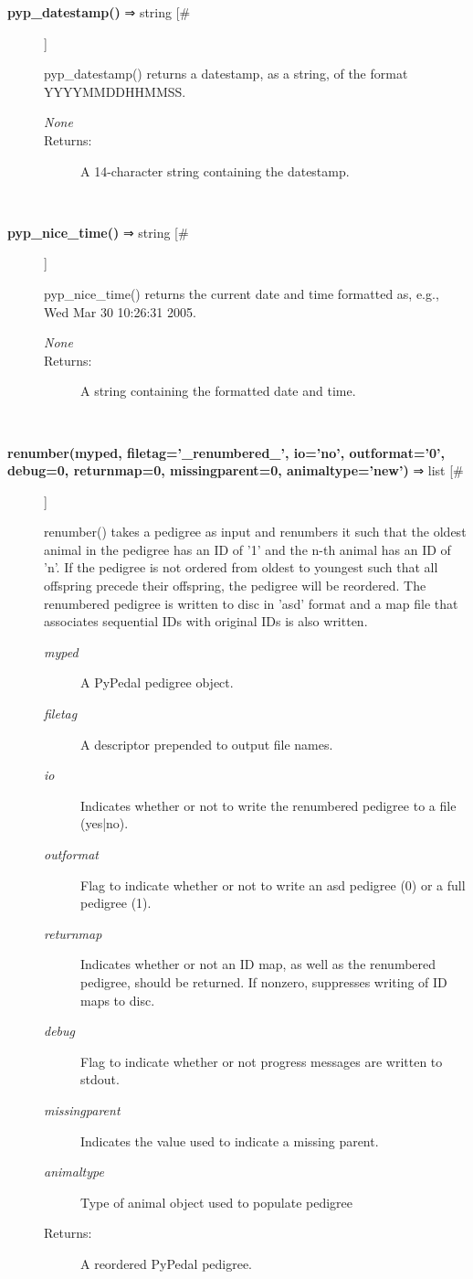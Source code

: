 \documentclass{article}
\begin{document}
\begin{description}
\item[\textbf{pyp\_datestamp()} ⇒ string [\#]
]
\par pyp\_datestamp() returns a datestamp, as a string, of the format
YYYYMMDDHHMMSS.
\begin{description}
\item[\textit{None}
]

\item[Returns:
]
A 14-character string containing the datestamp.
\end{description}\\

\item[\textbf{pyp\_nice\_time()} ⇒ string [\#]
]
\par pyp\_nice\_time() returns the current date and time formatted as, e.g.,
Wed Mar 30 10:26:31 2005.
\begin{description}
\item[\textit{None}
]

\item[Returns:
]
A string containing the formatted date and time.
\end{description}\\

\item[\textbf{renumber(myped, filetag='\_renumbered\_', io='no', outformat='0', debug=0, returnmap=0, missingparent=0, animaltype='new')} ⇒ list [\#]
]
\par renumber() takes a pedigree as input and renumbers it such that the oldest
animal in the pedigree has an ID of '1' and the n-th animal has an ID of 'n'.  If the
pedigree is not ordered from oldest to youngest such that all offspring precede their
offspring, the pedigree will be reordered.  The renumbered pedigree is written to disc in
'asd' format and a map file that associates sequential IDs with original IDs is also
written.
\begin{description}
\item[\textit{myped}
]
A PyPedal pedigree object.
\item[\textit{filetag}
]
A descriptor prepended to output file names.
\item[\textit{io}
]
Indicates whether or not to write the renumbered pedigree to a file (yes|no).
\item[\textit{outformat}
]
Flag to indicate whether or not to write an asd pedigree (0) or a full pedigree (1).
\item[\textit{returnmap}
]
Indicates whether or not an ID map, as well as the renumbered pedigree, should be returned.  If nonzero, suppresses writing of ID maps to disc.
\item[\textit{debug}
]
Flag to indicate whether or not progress messages are written to stdout.
\item[\textit{missingparent}
]
Indicates the value used to indicate a missing parent.
\item[\textit{animaltype}
]
Type of animal object used to populate pedigree
\item[Returns:
]
A reordered PyPedal pedigree.
\end{description}\\


\end{description}
\end{document}
